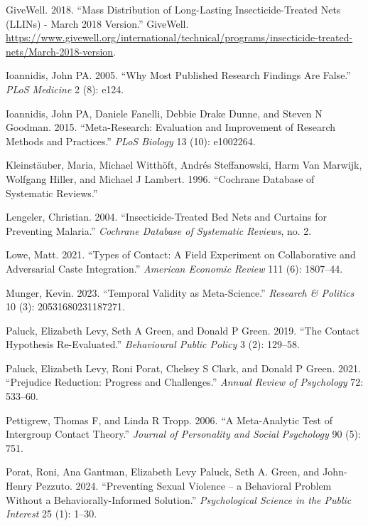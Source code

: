 \documentclass{article}
\newlength{\cslhangindent}
\newenvironment{CSLReferences}[2] %
 {\begin{list}{}{%
  \setlength{\itemindent}{0pt}
  \setlength{\leftmargin}{0pt}
  \setlength{\parsep}{0pt}
  \ifodd #1
   \setlength{\leftmargin}{\cslhangindent}
   \setlength{\itemindent}{-1\cslhangindent}
  \fi
  \setlength{\itemsep}{#2\baselineskip}}}
 {\end{list}}
\begin{document}
\begin{CSLReferences}{1}{0}
GiveWell. 2018. {``Mass Distribution of Long-Lasting Insecticide-Treated
Nets (LLINs) - March 2018 Version.''} GiveWell.
\url{https://www.givewell.org/international/technical/programs/insecticide-treated-nets/March-2018-version}.

Ioannidis, John PA. 2005. {``Why Most Published Research Findings Are
False.''} \emph{PLoS Medicine} 2 (8): e124.

Ioannidis, John PA, Daniele Fanelli, Debbie Drake Dunne, and Steven N
Goodman. 2015. {``Meta-Research: Evaluation and Improvement of Research
Methods and Practices.''} \emph{PLoS Biology} 13 (10): e1002264.

Kleinstäuber, Maria, Michael Witthöft, Andrés Steffanowski, Harm Van
Marwijk, Wolfgang Hiller, and Michael J Lambert. 1996. {``Cochrane
Database of Systematic Reviews.''}

Lengeler, Christian. 2004. {``Insecticide-Treated Bed Nets and Curtains
for Preventing Malaria.''} \emph{Cochrane Database of Systematic
Reviews}, no. 2.

Lowe, Matt. 2021. {``Types of Contact: A Field Experiment on
Collaborative and Adversarial Caste Integration.''} \emph{American
Economic Review} 111 (6): 1807--44.

Munger, Kevin. 2023. {``Temporal Validity as Meta-Science.''}
\emph{Research \& Politics} 10 (3): 20531680231187271.

Paluck, Elizabeth Levy, Seth A Green, and Donald P Green. 2019. {``The
Contact Hypothesis Re-Evaluated.''} \emph{Behavioural Public Policy} 3
(2): 129--58.

Paluck, Elizabeth Levy, Roni Porat, Chelsey S Clark, and Donald P Green.
2021. {``Prejudice Reduction: Progress and Challenges.''} \emph{Annual
Review of Psychology} 72: 533--60.

Pettigrew, Thomas F, and Linda R Tropp. 2006. {``A Meta-Analytic Test of
Intergroup Contact Theory.''} \emph{Journal of Personality and Social
Psychology} 90 (5): 751.

Porat, Roni, Ana Gantman, Elizabeth Levy Paluck, Seth A. Green, and
John-Henry Pezzuto. 2024. {``Preventing Sexual Violence -- a Behavioral
Problem Without a Behaviorally-Informed Solution.''} \emph{Psychological
Science in the Public Interest} 25 (1): 1--30.


\end{CSLReferences}
\end{document}
